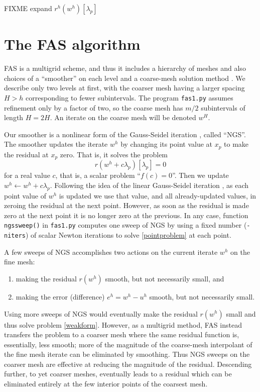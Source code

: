\documentclass[letterpaper,final,12pt,reqno]{amsart}
\begin{document}
FIXME expand $r^h(w^h)[\lambda_p]$


\section{The FAS algorithm}

FAS is a multigrid scheme, and thus it includes a hierarchy of meshes and also choices of a ``smoother'' on each level and a coarse-mesh solution method \cite{Briggsetal2000}.  We describe only two levels at first, with the coarser mesh having a larger spacing $H>h$ corresponding to fewer subintervals.  The program \texttt{fas1.py} assumes refinement only by a factor of two, so the coarse mesh has $m/2$ subintervals of length $H=2H$.  An iterate on the coarse mesh will be denoted $w^H$.

Our smoother is a nonlinear form of the Gauss-Seidel iteration \cite{Briggsetal2000}, called ``NGS''.  The smoother updates the iterate $w^h$ by changing its point value at $x_p$ to make the residual at $x_p$ zero.  That is, it solves the problem
\begin{equation}
r(w^h + c \lambda_p)[\lambda_p] = 0  \label{pointproblem}
\end{equation}
for a real value $c$, that is, a scalar problem ``$f(c)=0$''.  Then we update $w^h \longleftarrow w^h + c \lambda_p$.  Following the idea of the linear Gauss-Seidel iteration \cite{Bueler2021}, as each point value of $w^h$ is updated we use that value, and all already-updated values, in zeroing the residual at the next point.  However, as soon as the residual is made zero at the next point it is no longer zero at the previous.  In any case, function \texttt{ngssweep()} in \texttt{fas1.py} computes one sweep of NGS by using a fixed number (\texttt{-niters}) of scalar Newton iterations to solve \eqref{pointproblem} at each point.

A few sweeps of NGS accomplishes two actions on the current iterate $w^h$ on the fine mesh:
\renewcommand{\labelenumi}{\emph{\roman{enumi})}}
\begin{enumerate}
\item making the residual $r(w^h)$ smooth, but not necessarily small, and
\item making the error (difference) $e^h = w^h - u^h$ smooth, but not necessarily small.
\end{enumerate}
Using more sweeps of NGS would eventually make the residual $r(w^h)$ small and thus solve problem \eqref{weakform}.  However, as a multigrid method, FAS instead transfers the problem to a coarser mesh where the same residual function is, essentially, less smooth; more of the magnitude of the coarse-mesh interpolant of the fine mesh iterate can be eliminated by smoothing.  Thus NGS sweeps on the coarser mesh are effective at reducing the magnitude of the residual.  Descending further, to yet coarser meshes, eventually leads to a residual which can be eliminated entirely at the few interior points of the coarsest mesh.
\end{document}
